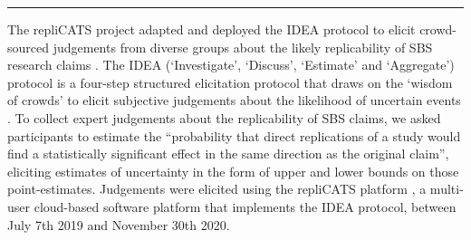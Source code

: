 \documentclass[article]{jss}
\begin{document}
\begin{center}\rule{0.5\linewidth}{0.5pt}\end{center}

The repliCATS project adapted and deployed the IDEA protocol to elicit
crowd-sourced judgements from diverse groups about the likely
replicability of SBS research claims \citep{Fraser:2021}. The IDEA
(`Investigate', `Discuss', `Estimate' and `Aggregate') protocol is a
four-step structured elicitation protocol that draws on the `wisdom of
crowds' to elicit subjective judgements about the likelihood of
uncertain events \citep[figure 1]{hemming2017}. To collect expert
judgements about the replicability of SBS claims, we asked participants
to estimate the ``probability that direct replications of a study would
find a statistically significant effect in the same direction as the
original claim'', eliciting estimates of uncertainty in the form of
upper and lower bounds on those point-estimates. Judgements were
elicited using the repliCATS platform \citep{Pearson2021}, a multi-user
cloud-based software platform that implements the IDEA protocol, between
July 7th 2019 and November 30th 2020.
\end{document}
